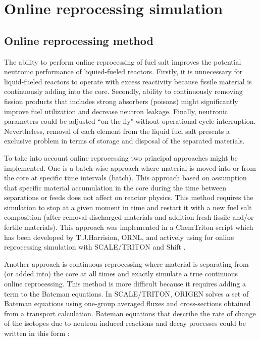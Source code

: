\chapter[Online reprocessing simulation]{Online reprocessing simulation}

\section{Online reprocessing method}
The ability to perform online reprocessing of fuel salt improves the potential neutronic performance of liquied-fueled reactors. Firstly, it is unnecessary for liquid-fueled reactors to operate with excess reactivity because fissile material is continuously adding into the core. Secondly, ability to continuously removing fission products that includes strong absorbers (poisons) might significantly improve fuel utilization and decrease neutron leakage. Finally, neutronic parameters could be adjusted ``on-the-fly" without operational cycle interruption. Nevertheless, removal of each element from the liquid fuel salt presents a exclusive problem in terms of storage and disposal of the separated materials.

To take into account online reprocessing two principal approaches might be implemented. One is a batch-wise approach where material is moved into or from the core at specific time intervals (batch). This approach based on assumption that specific material accumulation in the core during the time between separations or feeds does not affect on reactor physics. This method requires the simulation to stop at a given moment in time and restart it with a new fuel salt composition (after removal discharged materials and addition fresh fissile and/or fertile materials). This approach was implemented in a ChemTriton script \cite{powers_new_2013} which has been developed by T.J.Harrision, \gls{ORNL}, and actively using for online reprocessing simulation with SCALE/TRITON \cite{bowman_scale_2011} and Shift \cite{pandya_implementation_2016}. 

Another approach is continuous reprocessing where material is separating from (or added into) the core at all times and exactly simulate a true continuous online reprocessing. This method is more difficult because it requires adding a term to the Bateman equations. In SCALE/TRITON, ORIGEN \cite{gauld_isotopic_2011} solves a set of Bateman equations using one-group averaged fluxes and cross-sections obtained from a transport calculation. Bateman equations that describe the rate of change of the isotopes due to neutron induced reactions and decay
processes could be written in this form \cite{aufiero_extended_2013}:

